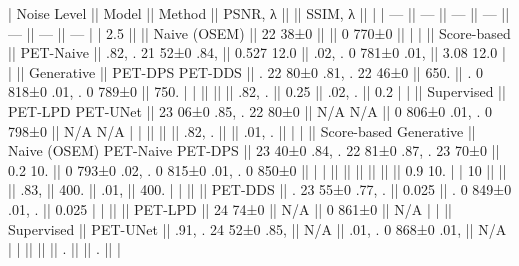 \documentclass{article}
\begin{document}
| Noise Level || Model                  || Method                         || PSNR, λ                               ||            || SSIM, λ                               ||           |
| ---         || ---                    || ---                            || ---                                   || ---        || ---                                   || ---       |
| 2.5         ||                        || Naive (OSEM)                   || 22 38±0                               ||            || 0 770±0                               ||           |
|             || Score-based            || PET-Naive                      || .82, . 21 52±0 .84,                   || 0.527 12.0 || .02, . 0 781±0 .01,                   || 3.08 12.0 |
|             || Generative             || PET-DPS PET-DDS                || . 22 80±0 .81, . 22 46±0              || 650.       || . 0 818±0 .01, . 0 789±0              || 750.      |
|             ||                        ||                                || .82, .                                || 0.25       || .02, .                                || 0.2       |
|             || Supervised             || PET-LPD PET-UNet               || 23 06±0 .85, . 22 80±0                || N/A N/A    || 0 806±0 .01, . 0 798±0                || N/A N/A   |
|             ||                        ||                                || .82, .                                ||            || .01, .                                ||           |
|             || Score-based Generative || Naive (OSEM) PET-Naive PET-DPS || 23 40±0 .84, . 22 81±0 .87, . 23 70±0 || 0.2 10.    || 0 793±0 .02, . 0 815±0 .01, . 0 850±0 ||           |
|             ||                        ||                                ||                                       ||            ||                                       || 0.9 10.   |
| 10          ||                        ||                                || .83,                                  || 400.       || .01,                                  || 400.      |
|             ||                        || PET-DDS                        || . 23 55±0 .77, .                      || 0.025      || . 0 849±0 .01, .                      || 0.025     |
|             ||                        || PET-LPD                        || 24 74±0                               || N/A        || 0 861±0                               || N/A       |
|             || Supervised             || PET-UNet                       || .91, . 24 52±0 .85,                   || N/A        || .01, . 0 868±0 .01,                   || N/A       |
|             ||                        ||                                || .                                     ||            || .                                     ||           |
\end{document}
